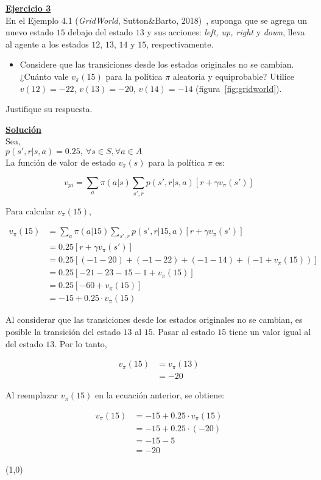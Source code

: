\indent\underline{\textbf{Ejercicio 3}}\\
En el Ejemplo 4.1 (\textit{GridWorld}, Sutton\&Barto, 2018)~\cite{Sutton2018}, suponga que se agrega un nuevo estado $15$ debajo del estado $13$ y sus acciones: \textit{left, up, right} y \textit{down}, lleva al agente a los estados $12$, $13$, $14$ y $15$, respectivamente.

\begin{itemize}
    \item Considere que las transiciones desde los estados originales no se cambian.
    ¿Cuánto vale $v_{\pi}(15)$ para la política $\pi$ aleatoria y equiprobable?
    Utilice $v(12) = -22$, $v(13) = -20$, $v(14) = -14$ (figura~\ref{fig:gridworld}).
\end{itemize}

Justifique su respuesta.

\indent\underline{\textbf{Solución}}\\
Sea,\\
$p(s',r|s,a) = 0.25, \ \forall s \in S, \forall a \in A$\\

La función de valor de estado $v_{\pi}(s)$ para la política $\pi$ es:

\[
    v_{pi} = \sum_{a} \pi(a|s) \sum_{s',r} p(s',r|s,a) \left[ r + \gamma v_{\pi}(s') \right]
\]

Para calcular $v_{\pi}(15)$,

\begin{align*}
    v_{\pi}(15) &= \sum_{a} \pi(a|15) \sum_{s',r} p(s',r|15,a) \left[ r + \gamma v_{\pi}(s') \right] \\
    &= 0.25 \left[ r + \gamma v_{\pi}(s') \right] \\
    &= 0.25 \left[\left(-1 -20 \right) + \left(-1 -22 \right) + \left(-1 -14 \right) + \left(-1 + v_{\pi}(15) \right) \right] \\
    &= 0.25 \left[ -21 -23 -15 -1 + v_{\pi}(15) \right] \\
    &= 0.25 \left[ -60 + v_{\pi}(15) \right] \\
    &= -15 + 0.25 \cdot v_{\pi}(15)
\end{align*}

Al considerar que las transiciones desde los estados originales no se cambian, es posible la transición del estado $13$ al $15$.
Pasar al estado $15$ tiene un valor igual al del estado $13$.
Por lo tanto,

\begin{align*}
    v_{\pi}(15) &= v_{\pi}(13) \\
    &= -20
\end{align*}

Al reemplazar $v_{\pi}(15)$ en la ecuación anterior, se obtiene:

\begin{align*}
    v_{\pi}(15) &= -15 + 0.25 \cdot v_{\pi}(15) \\
    &= -15 + 0.25 \cdot (-20) \\
    &= -15 - 5 \\
    &= -20
\end{align*}

\line(1,0){\textwidth}
